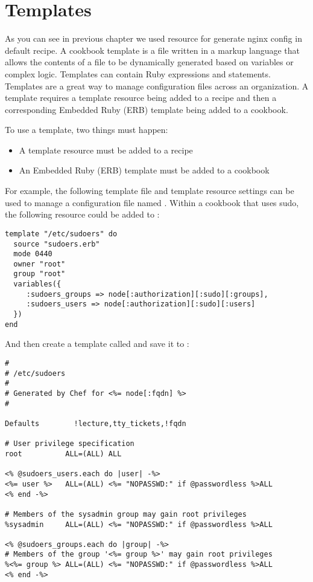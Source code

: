 \section{Templates}
\label{sec:cookbook-templates}

As you can see in previous chapter we used resource  for generate nginx config in default recipe. A cookbook template is a file written in a markup language that allows the contents of a file to be dynamically generated based on variables or complex logic. Templates can contain Ruby expressions and statements. Templates are a great way to manage configuration files across an organization. A template requires a template resource being added to a recipe and then a corresponding Embedded Ruby (ERB) template being added to a cookbook.

To use a template, two things must happen:

\begin{itemize}
  \item A template resource must be added to a recipe
  \item An Embedded Ruby (ERB) template must be added to a cookbook
\end{itemize}

For example, the following template file and template resource settings can be used to manage a configuration file named . Within a cookbook that uses sudo, the following resource could be added to :

\begin{lstlisting}[label=lst:cookbook-templates1]
template "/etc/sudoers" do
  source "sudoers.erb"
  mode 0440
  owner "root"
  group "root"
  variables({
     :sudoers_groups => node[:authorization][:sudo][:groups],
     :sudoers_users => node[:authorization][:sudo][:users]
  })
end
\end{lstlisting}

And then create a template called  and save it to :

\begin{lstlisting}[label=lst:cookbook-templates2]
#
# /etc/sudoers
#
# Generated by Chef for <%= node[:fqdn] %>
#

Defaults        !lecture,tty_tickets,!fqdn

# User privilege specification
root          ALL=(ALL) ALL

<% @sudoers_users.each do |user| -%>
<%= user %>   ALL=(ALL) <%= "NOPASSWD:" if @passwordless %>ALL
<% end -%>

# Members of the sysadmin group may gain root privileges
%sysadmin     ALL=(ALL) <%= "NOPASSWD:" if @passwordless %>ALL

<% @sudoers_groups.each do |group| -%>
# Members of the group '<%= group %>' may gain root privileges
%<%= group %> ALL=(ALL) <%= "NOPASSWD:" if @passwordless %>ALL
<% end -%>
\end{lstlisting}

